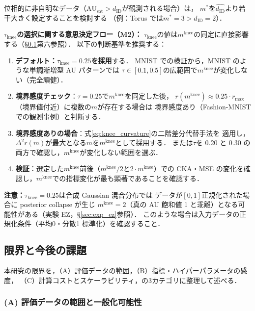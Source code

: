 \documentclass[12pt,a4paper]{jsarticle}
\newcommand{\dID}{d_{\mathrm{ID}}}
\newcommand{\dzopt}{m^*}                    %
\newcommand{\AUsat}{\mathrm{AU}_{\mathrm{sat}}}
\newcommand{\mknee}{m^{\mathrm{knee}}}      %
\begin{document}
位相的に非自明なデータ（$\AUsat > \dID$が観測される場合）は，
$\dzopt$を$\hat{\dID}$より若干大きく設定することを検討する
（例：Torus では$\dzopt = 3 > \dID = 2$）．

\textbf{$\tau_{\mathrm{knee}}$の選択に関する意思決定フロー（M2）：}
$\tau_{\mathrm{knee}}$の値は$\mknee$の同定に直接影響する（§\ref{sec:disc_limitation}第六参照）．
以下の判断基準を推奨する：

\begin{enumerate}
  \item \textbf{デフォルト：$\tau_{\mathrm{knee}} = 0.25$を採用}する．
        MNIST での検証から，MNIST のような単調漸増型 AU パターンでは
        $\tau \in [0.1, 0.5]$の広範囲で$\mknee$が変化しない（完全頑健）．
  \item \textbf{境界感度チェック}：$\tau = 0.25$で$\mknee$を同定した後，
        $r(\mknee) \approx 0.25 \cdot r_{\max}$（境界値付近）に複数の$m$が存在する場合は
        境界感度あり（Fashion-MNIST での観測事例）と判断する．
  \item \textbf{境界感度ありの場合}：式\eqref{eq:knee_curvature}の二階差分代替手法を
        適用し，$\Delta^2 r(m)$が最大となる$m$を$\mknee$として採用する．
        または$\tau$を 0.20 と 0.30 の両方で確認し，$\mknee$が変化しない範囲を選ぶ．
  \item \textbf{検証}：選定した$\mknee$前後（$\mknee/2$と$2\cdot\mknee$）での
        CKA・MSE の変化を確認し，$\mknee$での指標変化が最も顕著であることを確認する．
\end{enumerate}

\noindent
\textbf{注意：}$\tau_{\mathrm{knee}} = 0.25$は合成 Gaussian 混合分布では
データが$[0,1]$正規化された場合に posterior collapse が生じ
$\mknee = 2$（真の AU 飽和値 1 と乖離）となる可能性がある（実験 EZ，§\ref{sec:exp_ez}参照）．
このような場合は入力データの正規化条件（平均0・分散1 標準化）を確認すること．

\subsection{限界と今後の課題}\label{sec:disc_limitation}

本研究の限界を，（A）評価データの範囲，（B）指標・ハイパーパラメータの感度，
（C）計算コストとスケーラビリティ，の3カテゴリに整理して述べる．

\subsubsection*{(A) 評価データの範囲と一般化可能性}
\end{document}
